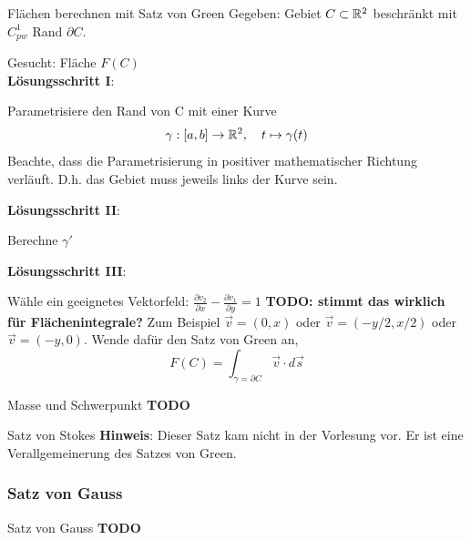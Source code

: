 \begin{Rezept}{Flächen berechnen mit Satz von Green}{}
	Gegeben: Gebiet $C \subset \mathbb{R}^2$ beschränkt mit $C^1_{pw}$ Rand $\partial C$.
	
	Gesucht: Fläche $F(C)$\\
	
	\textbf{Lösungsschritt I}:
	
	Parametrisiere den Rand von C mit einer Kurve
	\[
  		\gamma:[a, b] \to \mathbb{R}^2,\quad t \mapsto \gamma(t)
	\]
	Beachte, dass die Parametrisierung in positiver mathematischer Richtung verläuft. D.h. das Gebiet muss jeweils links der Kurve sein.
	
	\textbf{Lösungsschritt II}:
	
	Berechne $\gamma'$

	\textbf{Lösungsschritt III}:
	
	Wähle ein geeignetes Vektorfeld:
	$\frac{\partial v_2}{\partial x} -\frac{\partial v_1}{\partial y} = 1$ 
	\textbf{TODO: stimmt das wirklich für Flächenintegrale?}
	Zum Beispiel $\vec v = (0, x)$ oder $\vec v = (-y/2, x/2)$ oder $\vec v = (-y, 0)$.
	Wende dafür den Satz von Green an,
	\[
  		F(C) = \int_{\gamma=\partial C} \vec{v} \cdot d\vec{s}
	\]
\end{Rezept}

\begin{Satz}{Masse und Schwerpunkt}{}
	\textbf{TODO}	
\end{Satz}

\begin{Satz}{Satz von Stokes}{}
	\textbf{Hinweis}: Dieser Satz kam nicht in der Vorlesung vor. Er ist eine Verallgemeinerung des Satzes von Green.	
\end{Satz}

\subsubsection{Satz von Gauss}

\begin{Satz}{Satz von Gauss}{}
	\textbf{TODO}	
\end{Satz}


